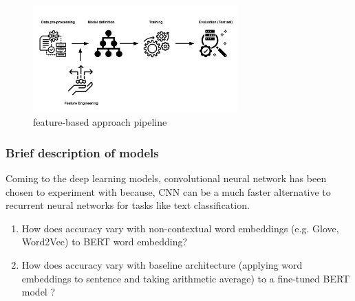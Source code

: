 \begin{figure}[]
    \centering
    \includegraphics[width=0.7\textwidth]{thesis/figures/Baseline_pipeline (2).png}
    \caption{feature-based approach pipeline}
    \label{fig:feature-based approach pipeline}
\end{figure}

\subsubsection{Brief description of models}
Coming to the deep learning models, convolutional neural network has been chosen to experiment with because, CNN can be a much faster alternative to recurrent neural networks for tasks like text classification. 
\begin{enumerate}
    \item How does accuracy vary with non-contextual word embeddings (e.g. Glove, Word2Vec) to BERT word embedding?
    \item How does accuracy vary with baseline architecture (applying word embeddings to sentence and taking arithmetic average) to a fine-tuned BERT model ?
\end{enumerate}

